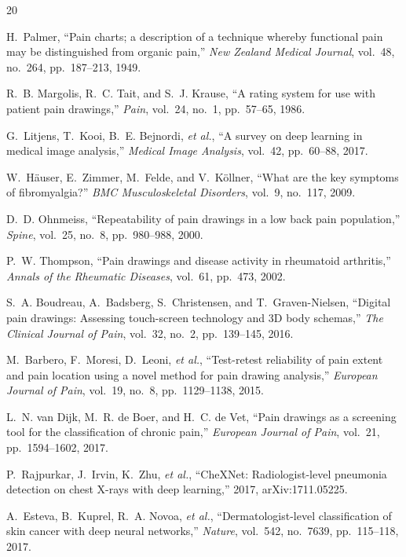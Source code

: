 \documentclass[conference]{IEEEtran}
\begin{document}
\begin{thebibliography}{20}

H.~Palmer, ``Pain charts; a description of a technique whereby functional pain may be distinguished from organic pain,'' \emph{New Zealand Medical Journal}, vol.~48, no.~264, pp.~187--213, 1949.

R.~B. Margolis, R.~C. Tait, and S.~J. Krause, ``A rating system for use with patient pain drawings,'' \emph{Pain}, vol.~24, no.~1, pp.~57--65, 1986.

G.~Litjens, T.~Kooi, B.~E. Bejnordi, \emph{et al.}, ``A survey on deep learning in medical image analysis,'' \emph{Medical Image Analysis}, vol.~42, pp.~60--88, 2017.

W.~H{\"a}user, E.~Zimmer, M.~Felde, and V.~K{\"o}llner, ``What are the key symptoms of fibromyalgia?'' \emph{BMC Musculoskeletal Disorders}, vol.~9, no.~117, 2009.

D.~D. Ohnmeiss, ``Repeatability of pain drawings in a low back pain population,'' \emph{Spine}, vol.~25, no.~8, pp.~980--988, 2000.

P.~W. Thompson, ``Pain drawings and disease activity in rheumatoid arthritis,'' \emph{Annals of the Rheumatic Diseases}, vol.~61, pp.~473, 2002.

S.~A. Boudreau, A.~Badsberg, S.~Christensen, and T.~Graven-Nielsen, ``Digital pain drawings: Assessing touch-screen technology and 3D body schemas,'' \emph{The Clinical Journal of Pain}, vol.~32, no.~2, pp.~139--145, 2016.

M.~Barbero, F.~Moresi, D.~Leoni, \emph{et al.}, ``Test-retest reliability of pain extent and pain location using a novel method for pain drawing analysis,'' \emph{European Journal of Pain}, vol.~19, no.~8, pp.~1129--1138, 2015.

L.~N. van Dijk, M.~R. de Boer, and H.~C. de Vet, ``Pain drawings as a screening tool for the classification of chronic pain,'' \emph{European Journal of Pain}, vol.~21, pp.~1594--1602, 2017.

P.~Rajpurkar, J.~Irvin, K.~Zhu, \emph{et al.}, ``CheXNet: Radiologist-level pneumonia detection on chest X-rays with deep learning,'' 2017, arXiv:1711.05225.

A.~Esteva, B.~Kuprel, R.~A. Novoa, \emph{et al.}, ``Dermatologist-level classification of skin cancer with deep neural networks,'' \emph{Nature}, vol.~542, no.~7639, pp.~115--118, 2017.


\end{thebibliography}
\end{document}
